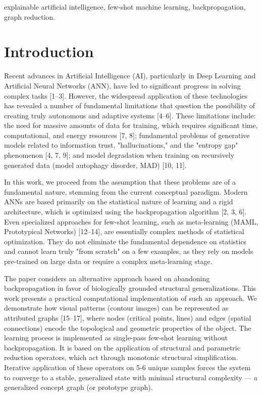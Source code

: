 \documentclass[conference]{IEEEtran}
\begin{document}
\begin{IEEEkeywords}
explainable artificial intelligence, few-shot machine learning, backpropagation, graph reduction.
\end{IEEEkeywords}

\section{Introduction}
Recent advances in Artificial Intelligence (AI), particularly in Deep Learning and Artificial Neural Networks (ANN), have led to significant progress in solving complex tasks [1--3]. However, the widespread application of these technologies has revealed a number of fundamental limitations that question the possibility of creating truly autonomous and adaptive systems [4--6]. These limitations include: the need for massive amounts of data for training, which requires significant time, computational, and energy resources [7, 8]; fundamental problems of generative models related to information trust, "hallucinations," and the "entropy gap" phenomenon [4, 7, 9]; and model degradation when training on recursively generated data (model autophagy disorder, MAD) [10, 11].

In this work, we proceed from the assumption that these problems are of a fundamental nature, stemming from the current conceptual paradigm. Modern ANNs are based primarily on the statistical nature of learning and a rigid architecture, which is optimized using the backpropagation algorithm [2, 3, 6]. Even specialized approaches for few-shot learning, such as meta-learning (MAML, Prototypical Networks) [12--14], are essentially complex methods of statistical optimization. They do not eliminate the fundamental dependence on statistics and cannot learn truly "from scratch" on a few examples, as they rely on models pre-trained on large data or require a complex meta-learning stage.

The paper considers an alternative approach based on abandoning backpropagation in favor of biologically grounded structural generalizations. This work presents a practical computational implementation of such an approach. We demonstrate how visual patterns (contour images) can be represented as attributed graphs [15--17], where nodes (critical points, lines) and edges (spatial connections) encode the topological and geometric properties of the object. The learning process is implemented as single-pass few-shot learning without backpropagation. It is based on the application of structural and parametric reduction operators, which act through monotonic structural simplification. Iterative application of these operators on 5-6 unique samples forces the system to converge to a stable, generalized state with minimal structural complexity — a generalized concept graph (or prototype graph).
\end{document}

